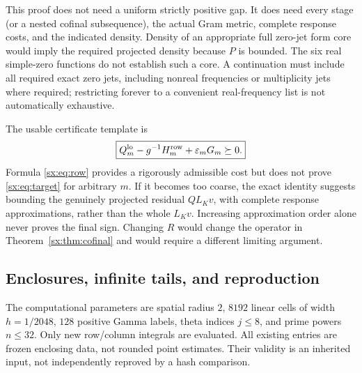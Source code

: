 \documentclass[11pt,a4paper]{article}
\numberwithin{equation}{section}
\theoremstyle{definition}\newtheorem{definition}[theorem]{Definition}
\theoremstyle{remark}\newtheorem{remark}[theorem]{Remark}
\begin{document}
This proof does not need a uniform strictly positive gap. It does need
every stage (or a nested cofinal subsequence), the actual Gram metric,
complete response costs, and the indicated density. Density of an
appropriate full zero-jet form core would imply the required projected
density because $P$ is bounded. The six real simple-zero functions do
not establish such a core. A continuation must include all required
exact zero jets, including nonreal frequencies or multiplicity jets
where required; restricting forever to a convenient real-frequency
list is not automatically exhaustive.

The usable certificate template is
\begin{equation}\label{sx:eq:target}
 \boxed{Q_m^{\rm lo}-g^{-1}H_m^{\rm row}
                  +\varepsilon_mG_m\succeq0.}
\end{equation}
Formula \eqref{sx:eq:row} provides a rigorously admissible cost but does
not prove \eqref{sx:eq:target} for arbitrary $m$. If it becomes too coarse,
the exact identity suggests bounding the genuinely projected residual
$QL_Kv$, with complete response approximations, rather than the whole
$L_Kv$. Increasing approximation order alone never proves the final
sign. Changing $R$ would change the operator in Theorem~\ref{sx:thm:cofinal}
and would require a different limiting argument.


\subsection{Enclosures, infinite tails, and reproduction}\label{sx:app:tails}
The computational parameters are spatial radius $2$, $8192$ linear
cells of width $h=1/2048$, $128$ positive Gamma labels, theta indices
$j\le8$, and prime powers $n\le32$. Only new row/column integrals are
evaluated. All existing entries are frozen enclosing data, not rounded
point estimates. Their validity is an inherited input, not independently
reproved by a hash comparison.
\end{document}
